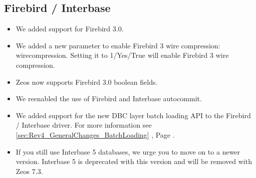 \documentclass[a4paper,12pt,oneside]{book}
\begin{document}
\subsection{Firebird / Interbase}
\label{sec:Rev4_DriverSpecificChanges_FirebirdInterbase}
\begin{itemize}
\item We added support for Firebird 3.0.
\item 
  We added a new parameter to enable Firebird 3 wire compression: wirecompression.
	Setting it to 1/Yes/True will enable Firebird 3 wire compression.
\item 
  Zeos now supports Firebird 3.0 boolean fields.
\item
  We reenabled the use of Firebird and Interbase autocommit.
\item
  We added support for the new DBC layer batch loading API to the Firebird / Interbase driver.
	For more information see \ref{sec:Rev4_GeneralChanges_BatchLoading} , Page \pageref{sec:Rev4_GeneralChanges_BatchLoading}.
\item 
  If you still use Interbase 5 databases, we urge you to move on to a newer version.
	Interbase 5 is deprecated with this version and will be removed with Zeos 7.3.	
\end{itemize}
\end{document}

